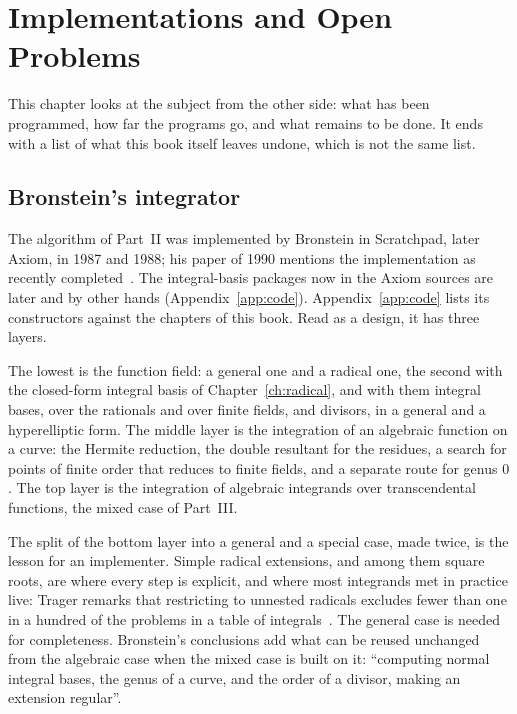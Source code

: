 \chapter{Implementations and Open Problems}\label{ch:implementations}

This chapter looks at the subject from the other side: what has been
programmed, how far the programs go, and what remains to be done. It ends
with a list of what this book itself leaves undone, which is not the same
list.

\section{Bronstein's integrator}\label{sec:impl-axiom}

The algorithm of Part~II was implemented by Bronstein in Scratchpad, later
Axiom, in 1987 and 1988; his paper of 1990 mentions the implementation as
recently completed~\cite[Conclusions]{bronstein1990}. The integral-basis
packages now in the Axiom sources are later and by other hands
(Appendix~\ref{app:code}).
Appendix~\ref{app:code} lists its constructors against the chapters of this
book. Read as a design, it has three layers.

The lowest is the function field: a general one and a radical one, the
second with the closed-form integral basis of Chapter~\ref{ch:radical}, and
with them integral bases, over the rationals and over finite fields, and
divisors, in a general and a hyperelliptic form. The middle layer is the
integration of an algebraic function on a curve: the Hermite reduction, the
double resultant for the residues, a search for points of finite order that
reduces to finite fields, and a separate route for genus $0$. The top layer
is the integration of algebraic integrands over transcendental functions,
the mixed case of Part~III.

The split of the bottom layer into a general and a special case, made twice,
is the lesson for an implementer. Simple radical extensions, and among them
square roots, are where every step is explicit, and where most integrands
met in practice live: Trager remarks that restricting to unnested radicals
excludes fewer than one in a hundred of the problems in a table of
integrals~\cite[Appendix~A]{trager1984}. The general case is needed for
completeness.
Bronstein's conclusions add what can be reused unchanged from the algebraic
case when the mixed case is built on it: ``computing normal integral bases,
the genus of a curve, and the order of a divisor, making an extension
regular''.

